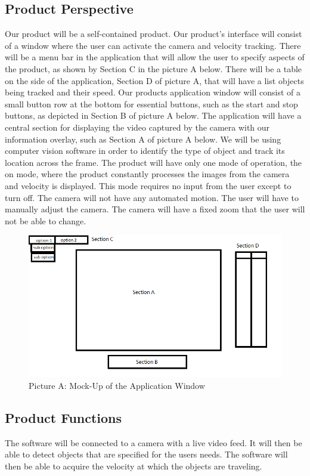 \documentclass[letterpaper,10pt,onecolumn,draftclsnofoot]{IEEEtran}
\begin{document}
\subsection{Product Perspective}
Our product will be a self-contained product. 
Our product's interface will consist of a window where the user can activate the camera and velocity tracking.
There will be a menu bar in the application that will allow the user to specify aspects of the product, as shown by Section C in the picture A below.
There will be a table on the side of the application, Section D of picture A, that will have a list objects being tracked and their speed.
Our products application window will consist of a small button row at the bottom for essential buttons, such as the start and stop buttons, as depicted in Section B of picture A below.
The application will have a central section for displaying the video captured by the camera with our information overlay, such as Section A of picture A below.
We will be using computer vision software in order to identify the type of object and track its location across the frame.
The product will have only one mode of operation, the on mode, where the product constantly processes the images from the camera and velocity is displayed.
This mode requires no input from the user except to turn off.
The camera will not have any automated motion.
The user will have to manually adjust the camera.
The camera will have a fixed zoom that the user will not be able to change.

\begin{figure}[h]
    \centering
    \includegraphics[scale=0.75]{cs_461_mock_up}
    \caption{Picture A: Mock-Up of the Application Window}
    \label{fig: pic_a}
\end{figure}


\subsection{Product Functions}
The software will be connected to a camera with a live video feed.
It will then be able to detect objects that are specified for the users needs.
The software will then be able to acquire the velocity at which the objects are traveling.
\end{document}
